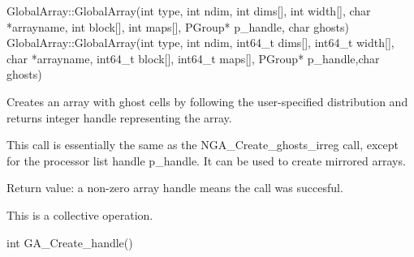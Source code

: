 \documentclass[12pt]{article}
\begin{document}
\begin{cxxapi}
\begin{cxxcode}
GlobalArray::GlobalArray(int type, int ndim, int dims[], int width[],
                         char *arrayname, int block[], int maps[],
                         PGroup* p_handle, char ghosts)
GlobalArray::GlobalArray(int type, int ndim, int64_t dims[], 
                         int64_t width[], char *arrayname, 
                         int64_t block[], int64_t maps[],
                         PGroup* p_handle,char ghosts)
\end{cxxcode}
\begin{funcargs}
\end{funcargs}
\end{cxxapi}

\begin{desc}

Creates an array with ghost cells by following the user-specified distribution
and returns integer handle representing the array.

This call is essentially the same as the NGA_Create_ghosts_irreg call, except
for the processor list handle p_handle. It can be used to create mirrored arrays.

Return value: a non-zero array handle means the call was succesful.

This is a collective operation.

\end{desc}



\begin{capi}
\begin{ccode}
int GA_Create_handle()
\end{ccode}
\end{capi}
\end{document}
